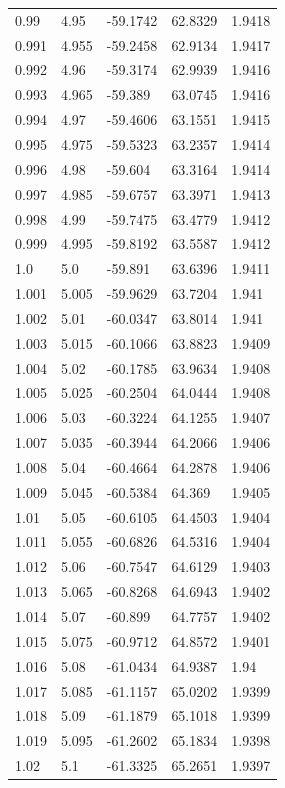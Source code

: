 \begin{tabular}{lllll}
0.99 & 4.95 & -59.1742 & 62.8329 & 1.9418 \\
0.991 & 4.955 & -59.2458 & 62.9134 & 1.9417 \\
0.992 & 4.96 & -59.3174 & 62.9939 & 1.9416 \\
0.993 & 4.965 & -59.389 & 63.0745 & 1.9416 \\
0.994 & 4.97 & -59.4606 & 63.1551 & 1.9415 \\
0.995 & 4.975 & -59.5323 & 63.2357 & 1.9414 \\
0.996 & 4.98 & -59.604 & 63.3164 & 1.9414 \\
0.997 & 4.985 & -59.6757 & 63.3971 & 1.9413 \\
0.998 & 4.99 & -59.7475 & 63.4779 & 1.9412 \\
0.999 & 4.995 & -59.8192 & 63.5587 & 1.9412 \\
1.0 & 5.0 & -59.891 & 63.6396 & 1.9411 \\
1.001 & 5.005 & -59.9629 & 63.7204 & 1.941 \\
1.002 & 5.01 & -60.0347 & 63.8014 & 1.941 \\
1.003 & 5.015 & -60.1066 & 63.8823 & 1.9409 \\
1.004 & 5.02 & -60.1785 & 63.9634 & 1.9408 \\
1.005 & 5.025 & -60.2504 & 64.0444 & 1.9408 \\
1.006 & 5.03 & -60.3224 & 64.1255 & 1.9407 \\
1.007 & 5.035 & -60.3944 & 64.2066 & 1.9406 \\
1.008 & 5.04 & -60.4664 & 64.2878 & 1.9406 \\
1.009 & 5.045 & -60.5384 & 64.369 & 1.9405 \\
1.01 & 5.05 & -60.6105 & 64.4503 & 1.9404 \\
1.011 & 5.055 & -60.6826 & 64.5316 & 1.9404 \\
1.012 & 5.06 & -60.7547 & 64.6129 & 1.9403 \\
1.013 & 5.065 & -60.8268 & 64.6943 & 1.9402 \\
1.014 & 5.07 & -60.899 & 64.7757 & 1.9402 \\
1.015 & 5.075 & -60.9712 & 64.8572 & 1.9401 \\
1.016 & 5.08 & -61.0434 & 64.9387 & 1.94 \\
1.017 & 5.085 & -61.1157 & 65.0202 & 1.9399 \\
1.018 & 5.09 & -61.1879 & 65.1018 & 1.9399 \\
1.019 & 5.095 & -61.2602 & 65.1834 & 1.9398 \\
1.02 & 5.1 & -61.3325 & 65.2651 & 1.9397 \\

\end{tabular}
